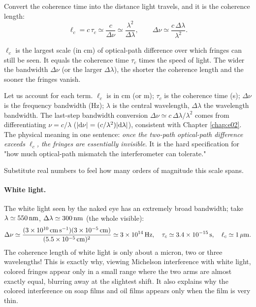 Convert the coherence time into the distance light travels, and it is the coherence length:
\begin{equation}
  \ell_c=c\,\tau_c\simeq\frac{c}{\Delta\nu}\simeq\frac{\lambda^2}{\Delta\lambda},
  \qquad
  \Delta\nu\simeq\frac{c\,\Delta\lambda}{\lambda^2}.
  \label{eq:e09-coherence-length}
\end{equation}
\begin{formulaexplain}
\(\ell_c\) is the largest scale (in cm) of optical-path difference over which fringes can still be seen. It equals the coherence time \(\tau_c\) times the speed of light. The wider the bandwidth \(\Delta\nu\) (or the larger \(\Delta\lambda\)), the shorter the coherence length and the sooner the fringes vanish.
\end{formulaexplain}
Let us account for each term. \(\ell_c\) is in cm (or m); \(\tau_c\) is the coherence time (s); \(\Delta\nu\) is the frequency bandwidth (Hz); \(\lambda\) is the central wavelength, \(\Delta\lambda\) the wavelength bandwidth. The last-step bandwidth conversion \(\Delta\nu\simeq c\,\Delta\lambda/\lambda^2\) comes from differentiating \(\nu=c/\lambda\) (\(|{\rm d}\nu|=(c/\lambda^2)|{\rm d}\lambda|\)), consistent with Chapter \ref{chap:e02}. The physical meaning in one sentence: \emph{once the two-path optical-path difference exceeds \(\ell_c\), the fringes are essentially invisible}. It is the hard specification for "how much optical-path mismatch the interferometer can tolerate."

Substitute real numbers to feel how many orders of magnitude this scale spans.

\paragraph{White light.} The white light seen by the naked eye has an extremely broad bandwidth; take \(\lambda\simeq550\,{\rm nm}\), \(\Delta\lambda\simeq300\,{\rm nm}\) (the whole visible):
\[
  \Delta\nu\simeq\frac{(3\times10^{10}\,{\rm cm\,s^{-1}})(3\times10^{-5}\,{\rm cm})}
  {(5.5\times10^{-5}\,{\rm cm})^2}\simeq3\times10^{14}\,{\rm Hz},
  \quad
  \tau_c\simeq3.4\times10^{-15}\,{\rm s},
  \quad
  \ell_c\simeq1\,\mu{\rm m}.
\]
The coherence length of white light is only about a micron, two or three wavelengths! This is exactly why, viewing Michelson interference with white light, colored fringes appear only in a small range where the two arms are almost exactly equal, blurring away at the slightest shift. It also explains why the colored interference on soap films and oil films appears only when the film is very thin.

